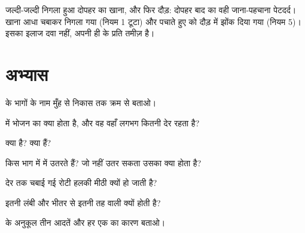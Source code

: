 \begin{example}[पेटदर्द का जासूस]\label{ex:g4:journey-of-food:ache}
जल्दी-जल्दी निगला हुआ दोपहर का खाना, और फिर दौड़: दोपहर बाद का वही
जाना-पहचाना पेटदर्द। खाना आधा चबाकर निगला गया (नियम 1 टूटा) और पचाते
हुए  को दौड़ में झोंक दिया गया (नियम 5)। इसका इलाज दवा नहीं,
अपनी ही  के प्रति तमीज़ है।
\end{example}

\section{अभ्यास}

\begin{exercise}[$\star$]\label{exo:g4:journey-of-food:1}
 के भागों के नाम मुँह से निकास तक क्रम से बताओ।
\end{exercise}

\begin{exercise}[$\star$]\label{exo:g4:journey-of-food:2}
 में भोजन का क्या होता है, और वह वहाँ लगभग कितनी देर रहता है?
\end{exercise}

\begin{exercise}[$\star$]\label{exo:g4:journey-of-food:3}
 क्या है?  क्या हैं?
\end{exercise}

\begin{exercise}[$\star$]\label{exo:g4:journey-of-food:4}
 किस भाग में  में उतरते हैं? जो नहीं उतर सकता उसका क्या
होता है?
\end{exercise}

\begin{exercise}[$\star$]\label{exo:g4:journey-of-food:5}
देर तक चबाई गई रोटी हलकी मीठी क्यों हो जाती है?
\end{exercise}

\begin{exercise}[$\star$]\label{exo:g4:journey-of-food:6}
 इतनी लंबी और भीतर से इतनी तह वाली क्यों होती है?
\end{exercise}

\begin{exercise}[$\star$]\label{exo:g4:journey-of-food:7}
 के अनुकूल तीन आदतें और हर एक का कारण बताओ।
\end{exercise}

